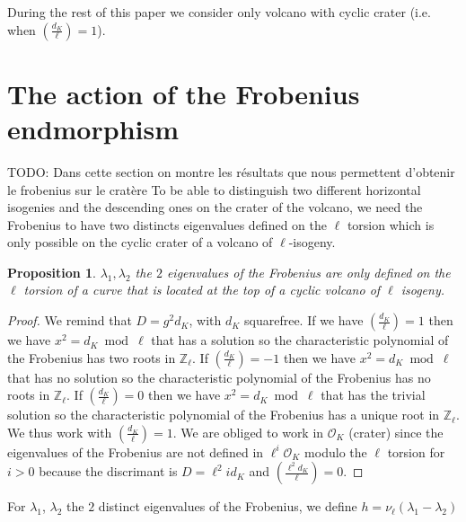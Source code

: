 \documentclass{lms}
\newcommand{\todo}[1]{{\color{red}TODO: #1}}
\newtheorem{prop}[thm]{Proposition}
\begin{document}
During the rest of this paper we consider only volcano with cyclic crater (i.e. when $\left( \frac{d_K}{\ell} \right) =1$).


\section{The action of the Frobenius endmorphism}
\label{sec:acti-frob-endm}
\todo{Dans cette section on montre les résultats que nous permettent d'obtenir le frobenius sur le cratère}
To be able to distinguish two different horizontal isogenies and the descending ones on the crater of the volcano, we need the Frobenius to have two distincts eigenvalues defined on the $\ell$ torsion which is only possible on the cyclic crater of a volcano of $\ell$-isogeny.

\begin{prop}
$\lambda_1 , \lambda_2$ the $2$ eigenvalues of the Frobenius are only defined on the $\ell$ torsion of a curve that is located at the top of a cyclic volcano of $\ell$ isogeny.
\end{prop}

\begin{proof}
We remind that $D=g^2d_K$, with $d_K$ squarefree.
\newline
If we have $\left( \frac{d_K}{\ell} \right)=1$ then we have $x^2 = d_K \bmod \ell$ that has a solution so the characteristic polynomial of the Frobenius has two roots in $\mathbb{Z}_{\ell}$. If $\left( \frac{d_K}{\ell} \right)=-1$ then we have $x^2 = d_K \bmod \ell$ that has no solution so the characteristic polynomial of the Frobenius has no roots in $\mathbb{Z}_{\ell}$. If $\left( \frac{d_K}{\ell} \right)=0$ then we have $x^2 = d_K \bmod \ell$ that has the trivial solution so the characteristic polynomial of the Frobenius has a unique root in $\mathbb{Z}_{\ell}$.
\newline
We thus work with $\left( \frac{d_K}{\ell} \right)=1$. We are obliged to work in $\mathcal{O}_K$ (crater)  since the eigenvalues of the Frobenius are not defined in $\ell^i \mathcal{O}_K$ modulo the $\ell$ torsion for $i>0$ because the discrimant is $D=\ell^2i d_K$ and $\left( \frac{\ell^2 d_K}{\ell} \right)=0$.
\end{proof}

\begin{defi}
For $\lambda_1$, $\lambda_2$ the $2$ distinct eigenvalues of the Frobenius, we define $h=\nu_{\ell} \left( \lambda_1 - \lambda_2 \right)$
\end{defi}
\end{document}
